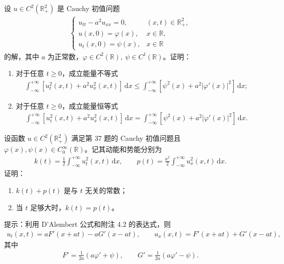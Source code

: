 \documentclass[../../main.tex]{subfiles}%
\begin{document}
\begin{example}
设 $u\in C^2(\mathbb{R}_+^2)$ 是 Cauchy 初值问题
\begin{align*}
\begin{cases}
u_{tt}-a^2u_{xx}=0, & (x,t)\in\mathbb{R}_+^2, \\
u(x,0)=\varphi(x), & x\in\mathbb{R}, \\
u_t(x,0)=\psi(x), & x\in\mathbb{R}
\end{cases}
\end{align*}
的解，其中 $a$ 为正常数，$\varphi\in C^2(\mathbb{R}),\ \psi\in C^1(\mathbb{R})$。证明：
\begin{enumerate}[(1)]
\item 对于任意 $t\geqslant 0$，成立能量不等式
\begin{align*}
\int_{-\infty}^{+\infty}[u_t^2(x,t)+a^2u_x^2(x,t)]\,\mathrm{d}x
\leqslant \int_{-\infty}^{+\infty}[\psi^2(x)+a^2|\varphi'(x)|^2]\,\mathrm{d}x;
\end{align*}
\item 对于任意 $t\geqslant 0$，成立能量恒等式
\begin{align*}
\int_{-\infty}^{+\infty}[u_t^2(x,t)+a^2u_x^2(x,t)]\,\mathrm{d}x
= \int_{-\infty}^{+\infty}[\psi^2(x)+a^2|\varphi'(x)|^2]\,\mathrm{d}x.
\end{align*}
\end{enumerate}
\end{example}

\begin{example}
设函数 $u\in C^2(\mathbb{R}_+^2)$ 满足第 37 题的 Cauchy 初值问题且 $\varphi(x),\psi(x)\in C_0^\infty(\mathbb{R})$。记其动能和势能分别为
\begin{align*}
k(t)=\frac{1}{2}\int_{-\infty}^{+\infty}u_t^2(x,t)\,\mathrm{d}x,\qquad
p(t)=\frac{a^2}{2}\int_{-\infty}^{+\infty}u_x^2(x,t)\,\mathrm{d}x.
\end{align*}
证明：
\begin{enumerate}[(1)]
\item $k(t)+p(t)$ 是与 $t$ 无关的常数；
\item 当 $t$ 足够大时，$k(t)=p(t)$。
\end{enumerate}
提示：利用 D'Alembert 公式和附注 4.2 的表达式，则
\begin{align*}
u_t(x,t)=aF'(x+at)-aG'(x-at),\qquad
u_x(x,t)=F'(x+at)+G'(x-at),
\end{align*}
其中
\begin{align*}
F'=\frac{1}{2a}(a\varphi'+\psi),\qquad G'=\frac{1}{2a}(a\varphi'-\psi).
\end{align*}
\end{example}
\end{document}
